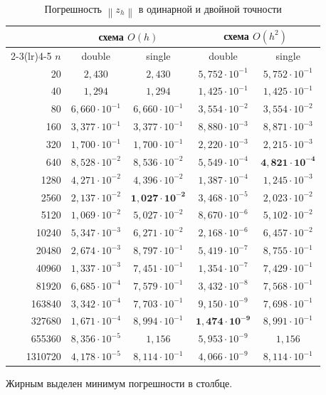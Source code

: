 \documentclass[12pt,a4paper]{article}
\newcommand{\norm}[1]{\left\lVert #1\right\rVert}
\begin{document}
\begin{table}[htbp]
\caption{Погрешность $\norm{z_h}$ в одинарной и двойной точности}
\label{tab:round}
\centering
\small
\begin{tabular}{rcccc}
\toprule
& \multicolumn{2}{c}{схема $O(h)$} & \multicolumn{2}{c}{схема $O(h^2)$}\\
\cmidrule(lr){2-3}\cmidrule(lr){4-5}
$n$ & double & single & double & single\\
\midrule
20      & $2{,}430$             & $2{,}430$             & $5{,}752\cdot10^{-1}$ & $5{,}752\cdot10^{-1}$\\
40      & $1{,}294$             & $1{,}294$             & $1{,}425\cdot10^{-1}$ & $1{,}425\cdot10^{-1}$\\
80      & $6{,}660\cdot10^{-1}$ & $6{,}660\cdot10^{-1}$ & $3{,}554\cdot10^{-2}$ & $3{,}554\cdot10^{-2}$\\
160     & $3{,}377\cdot10^{-1}$ & $3{,}377\cdot10^{-1}$ & $8{,}880\cdot10^{-3}$ & $8{,}871\cdot10^{-3}$\\
320     & $1{,}700\cdot10^{-1}$ & $1{,}700\cdot10^{-1}$ & $2{,}220\cdot10^{-3}$ & $2{,}215\cdot10^{-3}$\\
640     & $8{,}528\cdot10^{-2}$ & $8{,}536\cdot10^{-2}$ & $5{,}549\cdot10^{-4}$ & $\mathbf{4{,}821\cdot10^{-4}}$\\
1280    & $4{,}271\cdot10^{-2}$ & $4{,}396\cdot10^{-2}$ & $1{,}387\cdot10^{-4}$ & $1{,}245\cdot10^{-3}$\\
2560    & $2{,}137\cdot10^{-2}$ & $\mathbf{1{,}027\cdot10^{-2}}$ & $3{,}468\cdot10^{-5}$ & $2{,}023\cdot10^{-2}$\\
5120    & $1{,}069\cdot10^{-2}$ & $5{,}027\cdot10^{-2}$ & $8{,}670\cdot10^{-6}$ & $5{,}102\cdot10^{-2}$\\
10240   & $5{,}347\cdot10^{-3}$ & $6{,}271\cdot10^{-2}$ & $2{,}168\cdot10^{-6}$ & $6{,}457\cdot10^{-2}$\\
20480   & $2{,}674\cdot10^{-3}$ & $8{,}797\cdot10^{-1}$ & $5{,}419\cdot10^{-7}$ & $8{,}755\cdot10^{-1}$\\
40960   & $1{,}337\cdot10^{-3}$ & $7{,}451\cdot10^{-1}$ & $1{,}354\cdot10^{-7}$ & $7{,}429\cdot10^{-1}$\\
81920   & $6{,}685\cdot10^{-4}$ & $7{,}579\cdot10^{-1}$ & $3{,}432\cdot10^{-8}$ & $7{,}568\cdot10^{-1}$\\
163840  & $3{,}342\cdot10^{-4}$ & $7{,}703\cdot10^{-1}$ & $9{,}150\cdot10^{-9}$ & $7{,}698\cdot10^{-1}$\\
327680  & $1{,}671\cdot10^{-4}$ & $8{,}994\cdot10^{-1}$ & $\mathbf{1{,}474\cdot10^{-9}}$ & $8{,}991\cdot10^{-1}$\\
655360  & $8{,}356\cdot10^{-5}$ & $1{,}156$             & $5{,}953\cdot10^{-9}$ & $1{,}156$\\
1310720 & $4{,}178\cdot10^{-5}$ & $8{,}114\cdot10^{-1}$ & $4{,}066\cdot10^{-9}$ & $8{,}114\cdot10^{-1}$\\
\bottomrule
\end{tabular}

\smallskip
\footnotesize Жирным выделен минимум погрешности в столбце.
\end{table}
\end{document}
